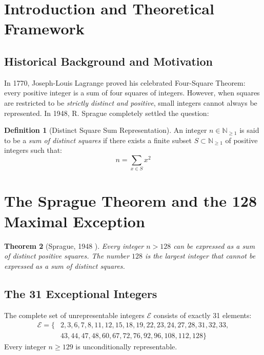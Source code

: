 \documentclass[11pt,a4paper]{article}
\newtheorem{theorem}{Theorem}[section]
\theoremstyle{definition}
\newtheorem{definition}[theorem]{Definition}
\begin{document}
\tableofcontents
\newpage

\section{Introduction and Theoretical Framework}

\subsection{Historical Background and Motivation}
In 1770, Joseph-Louis Lagrange proved his celebrated Four-Square Theorem: every positive integer is a sum of four squares of integers.
However, when squares are restricted to be \emph{strictly distinct and positive}, small integers cannot always be represented.
In 1948, R. Sprague \cite{sprague1948} completely settled the question:

\begin{definition}[Distinct Square Sum Representation]\label{def:distinct_square_sum}
An integer $n \in \mathbb{N}_{\ge 1}$ is said to be a \emph{sum of distinct squares} if there exists a finite subset $S \subset \mathbb{N}_{\ge 1}$ of positive integers such that:
\begin{equation}\label{eq:sq_sum_def}
n = \sum_{x \in S} x^2
\end{equation}
\end{definition}

\section{The Sprague Theorem and the 128 Maximal Exception}

\begin{theorem}[Sprague, 1948 \cite{sprague1948}]\label{thm:sprague_main}
Every integer $n > 128$ can be expressed as a sum of distinct positive squares.
The number $128$ is the largest integer that cannot be expressed as a sum of distinct squares.
\end{theorem}

\subsection{The 31 Exceptional Integers}
The complete set of unrepresentable integers $\mathcal{E}$ consists of exactly 31 elements:
\begin{align*}
\mathcal{E} = \{& 2, 3, 6, 7, 8, 11, 12, 15, 18, 19, 22, 23, 24, 27, 28, 31, 32, 33, \\
& 43, 44, 47, 48, 60, 67, 72, 76, 92, 96, 108, 112, 128 \}
\end{align*}
Every integer $n \ge 129$ is unconditionally representable.
\end{document}
